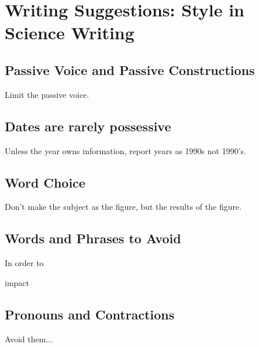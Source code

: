 \documentclass{tufte-handout}\usepackage[]{graphicx}\usepackage[]{color}
\newenvironment{enumerate*}%
  {\begin{enumerate}%
    \setlength{\itemsep}{0pt}%
    \setlength{\parskip}{0pt}}%
  {\end{enumerate}}
\begin{document}





\section{Writing Suggestions: Style in Science Writing}

\subsection{Passive Voice and Passive Constructions}

Limit the passive voice.

\subsection{Dates are rarely possessive}

Unless the year owns information, report years as 1990s not 1990's. 

\subsection{Word Choice}

Don't make the subject as the figure, but the results of the figure.

\subsection{Words and Phrases to Avoid}

In order to

impact



\subsection{Pronouns and Contractions}

Avoid them...
\end{document}
